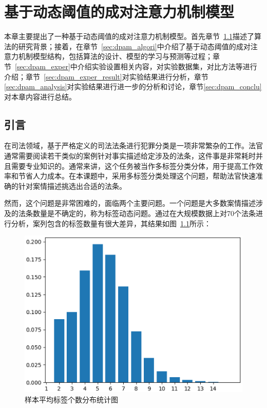 
\chapter{基于动态阈值的成对注意力机制模型}
\label{chapter:3}
本章主要提出了一种基于动态阈值的成对注意力机制模型。首先章节~\ref{sec:dpam_intro}描述了算法的研究背景；接着，在章节~\ref{sec:dpam_algori}中介绍了基于动态阈值的成对注意力机制模型结构，包括算法的设计、模型的学习与预测等过程；章节~\ref{sec:dpam_exper}中介绍实验设置相关内容，对实验数据集，对比方法等进行介绍；章节~\ref{sec:dpam_exper_result}对实验结果进行分析，章节\ref{sec:dpam_analysis}对实验结果进行进一步的分析和讨论，章节\ref{sec:dpam_conclu}对本章内容进行总结。

\section{引言}
\label{sec:dpam_intro}

在司法领域，基于严格定义的司法法条进行犯罪分类是一项非常繁杂的工作。法官通常需要阅读若干类似的案例针对事实描述给定涉及的法条，这件事是非常耗时并且需要专业知识的。通常来讲，这个任务被当作多标签分类分体，用于提高工作效率和节省人力成本。在本课题中，采用多标签分类处理这个问题，帮助法官快速准确的针对案情描述挑选出合适的法条。

然而，这个问题是非常困难的，面临两个主要问题。一个问题是大多数案情描述涉及的法条数量是不确定的，称为标签动态问题。通过在大规模数据上对70个法条进行分析，案列包含的标签数量有很大差异，其结果如图~\ref{fig:dis1}所示：
\begin{figure}[htb]
\centering
\includegraphics[scale=0.5,viewport=0 0 450 350,clip=true]{./sources/dpam_statistic1.eps}
\caption{\label{fig:dis1}样本平均标签个数分布统计图}
\end{figure}

